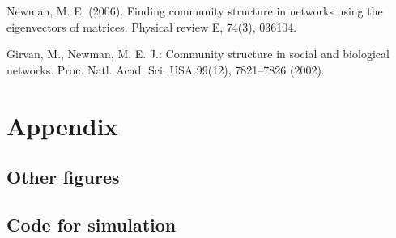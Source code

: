 \documentclass[runningheads]{llncs}
\begin{document}
\begin{thebibliography}{8}
    Newman, M. E. (2006). Finding community structure in networks using the eigenvectors of matrices. Physical review E, 74(3), 036104.

    Girvan, M., Newman, M. E. J.: Community structure in social and biological 
    networks. Proc. Natl. Acad. Sci. USA 99(12), 7821–7826 (2002). 
\end{thebibliography}

\section*{Appendix}

\subsection*{Other figures}


\subsection*{Code for simulation}
\end{document}
